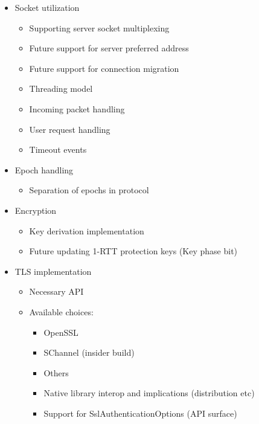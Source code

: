 \begin{itemize}
\begin{itemize}
    \end{itemize}

    \item Socket utilization
    \begin{itemize}

        \item Supporting server socket multiplexing
        \item Future support for server preferred address
        \item Future support for connection migration
        \item Threading model
        \item Incoming packet handling
        \item User request handling
        \item Timeout events

    \end{itemize}

    \item Epoch handling
    \begin{itemize}
        \item Separation of epochs in protocol
    \end{itemize}

    \item Encryption
    \begin{itemize}

        \item Key derivation implementation
        \item Future updating 1-RTT protection keys (Key phase bit)

    \end{itemize}

    \item TLS implementation

    \begin{itemize}

        \item Necessary API
        \item Available choices:
        \begin{itemize}

            \item OpenSSL
            \item SChannel (insider build)
            \item Others
            \item Native library interop and implications (distribution etc)
            \item Support for SslAuthenticationOptions (API surface)


\end{itemize}
\end{itemize}
\end{itemize}
